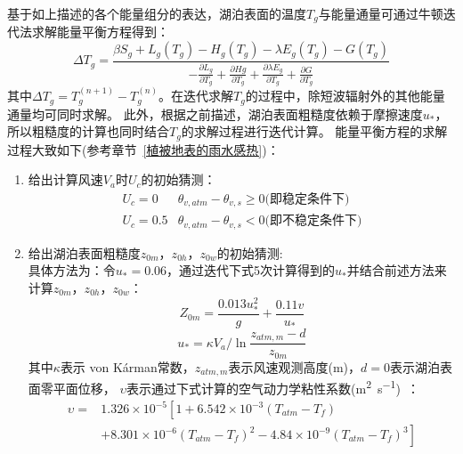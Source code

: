 基于如上描述的各个能量组分的表达，湖泊表面的温度$T_g$与能量通量可通过牛顿迭代法求解能量平衡方程得到：
\begin{equation}
\Delta T_{g}=\frac{\beta S_{g}+L_{g}\left(T_{g}\right)-H_{g}\left(T_{g}\right)
-\lambda E_{g}\left(T_{g}\right)-G\left(T_{g}\right)}{-\frac{\partial L_{g}}{\partial T_{g}}
+\frac{\partial H g}{\partial T_{g}}+\frac{\partial \lambda E_{g}}{\partial T_{g}}+\frac{\partial G}{\partial T_{g}}}
\end{equation}
其中$\Delta T_g=T_g^{\left(n+1\right)}-T_g^{\left(n\right)}$。在迭代求解$T_g$的过程中，除短波辐射外的其他能量通量均可同时求解。
此外，根据之前描述，湖泊表面粗糙度依赖于摩擦速度$u_\ast$，所以粗糙度的计算也同时结合$T_g$的求解过程进行迭代计算。
能量平衡方程的求解过程大致如下(参考章节~\ref{植被地表的雨水感热})：
\begin{enumerate}
    \item 给出计算风速$V_a$时$U_c$的初始猜测：
        \begin{equation}
        \begin{array}{ll}
            U_{c}=0 & \theta_{v, atm}-\theta_{v, s} \geq 0 \text{(即稳定条件下)} \\
            U_{c}=0.5 & \theta_{v, atm}-\theta_{v, s}<0 \text{(即不稳定条件下)}
        \end{array}
        \end{equation}
    \item 给出湖泊表面粗糙度$z_{0m}$，$z_{0h}$，$z_{0w}$的初始猜测:\\
        具体方法为：令$u_\ast=0.06$，通过迭代下式5次计算得到的$u_\ast$并结合前述方法来计算$z_{0m}$，$z_{0h}$，$z_{0w}$：
        \begin{equation}
        Z_{0 m}=\frac{0.013 u_{*}^{2}}{g}+\frac{0.11 v}{u_{*}}
        \end{equation}
        \begin{equation}
        u_{*}=\kappa V_{a} / \ln \frac{z_{atm, m}-d}{z_{0 m}}
        \end{equation}
        其中$\kappa$表示 von K\'arman常数，$z_{atm,m}$表示风速观测高度(m)，$d=0$表示湖泊表面零平面位移，
        $\upsilon$表示通过下式计算的空气动力学粘性系数(\unit{m^2.s^{-1}})~\citep{andreas1989thermal}：
        \begin{equation}
            \begin{array}{cl}
            \upsilon=&1.326\times{10}^{-5}\left[1+6.542\times{10}^{-3}\left(T_{atm}-T_f\right)\right.\\
                           & \left. +8.301\times{10}^{-6}\left(T_{atm}-T_f\right)^2-4.84\times{10}^{-9}\left(T_{atm}-T_f\right)^3\right]

\end{array}
\end{equation}
\end{enumerate}
